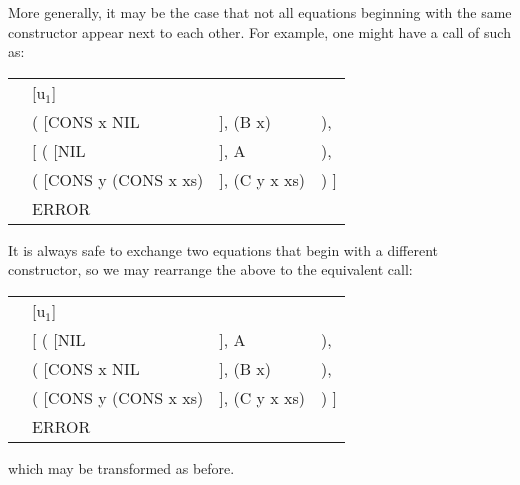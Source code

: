 More generally, it may be the case that not all equations beginning with the same constructor appear next to each other. For example, one might have a call of  such as:
\begin{mlcoded}
    \setlength{\tabcolsep}{0.25em}
    \begin{tabular}{llll}
        \metafn{match} &[u$_1$]  && \\
        &\phantom{[ }( [CONS x NIL&], (B x) &), \\
        &[ ( [NIL&], A &), \\
        &\phantom{[ }( [CONS y (CONS x xs)&], (C y x xs) &) ] \\
        &ERROR
    \end{tabular}
\end{mlcoded}
It is always safe to exchange two equations that begin with a different constructor, so we may rearrange the above to the equivalent call:
\begin{mlcoded}
    \setlength{\tabcolsep}{0.25em}
    \begin{tabular}{llll}
        \metafn{match} &[u$_1$]  && \\
        &[ ( [NIL&], A &), \\
        &\phantom{[ }( [CONS x NIL&], (B x) &), \\
        &\phantom{[ }( [CONS y (CONS x xs)&], (C y x xs) &) ] \\
        &ERROR
    \end{tabular}
\end{mlcoded}
which may be transformed as before.

